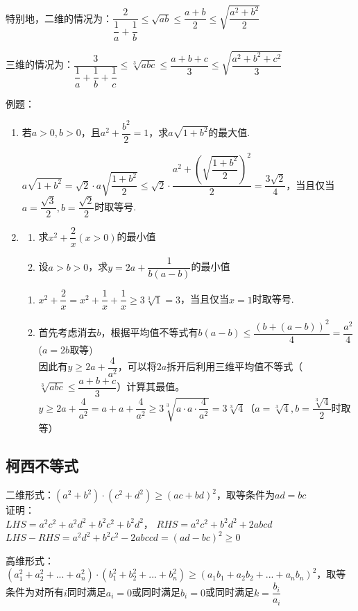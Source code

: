 特别地，二维的情况为：$\dfrac{2}{\dfrac{1}{a} + \dfrac{1}{b}} \leq \sqrt{ab} \leq \dfrac{a+b}{2} \leq \sqrt{\dfrac{a^2 + b^2}{2}}$ \\
\par 三维的情况为：$\dfrac{3}{\dfrac{1}{a} + \dfrac{1}{b} + \dfrac{1}{c}} \leq \sqrt[3]{abc} \leq \dfrac{a+b+c}{3} \leq \sqrt{\dfrac{a^2 + b^2 + c^2}{3}}$

例题：
\begin{enumerate}
    \item 若$a > 0, b > 0$，且$a^2+\dfrac{b^2}{2} = 1$，求$a\sqrt{1+b^2}$的最大值.
    \begin{jieda}
        $a\sqrt{1+b^2} = \sqrt{2} \cdot a \sqrt{\dfrac{1+b^2}{2}} \leq \sqrt{2} \cdot \dfrac{a^2 + \left(\sqrt{\dfrac{1+b^2}{2}}\right)^2}{2} = \dfrac{3\sqrt{2}}{4}$，当且仅当$a = \dfrac{\sqrt{3}}{2}, b = \dfrac{\sqrt{2}}{2}$时取等号.
    \end{jieda}
    
    \item 
    \begin{enumerate}
        \item 求$x^2+\dfrac{2}{x}(x>0)$的最小值
        \item 设$a > b > 0$，求$y = 2a + \dfrac{1}{b(a-b)}$的最小值
    \end{enumerate}
    \begin{jieda}
        \begin{enumerate}
            \item $x^2+\dfrac{2}{x} = x^2 + \dfrac{1}{x} + \dfrac{1}{x} \geq 3\sqrt[3]{1} = 3$，当且仅当$x = 1$时取等号.
            \item 首先考虑消去$b$，根据平均值不等式有$b(a-b) \leq \dfrac{(b+(a-b))^2}{4} = \dfrac{a^2}{4}$ ($a = 2b$取等)\\
            因此有$y \geq 2a + \dfrac{4}{a^2}$，可以将$2a$拆开后利用三维平均值不等式（$\sqrt[3]{abc} \leq \dfrac{a+b+c}{3}$）计算其最值。$y \geq 2a + \dfrac{4}{a^2} = a + a + \dfrac{4}{a^2} \geq 3\sqrt[3]{a\cdot a \cdot \dfrac{4}{a^2}} = 3\sqrt[3]{4}$（$a = \sqrt[3]{4}, b = \dfrac{\sqrt[3]{4}}{2}$时取等）
        \end{enumerate}
    \end{jieda}
\end{enumerate}

\subsection*{柯西不等式}
二维形式：$(a^2+b^2)\cdot(c^2+d^2) \geq (ac+bd)^2$，取等条件为$ad 
 = bc$ \\
证明：\\
$LHS = a^2c^2 + a^2d^2 + b^2c^2 + b^2d^2$， $RHS = a^2c^2 + b^2d^2 + 2abcd$ \\
$LHS - RHS = a^2d^2 + b^2c^2 - 2abccd = (ad-bc)^2 \geq 0$
\par 高维形式：$(a_1^2 + a_2^2 + ... + a_n^2) \cdot (b_1^2 + b_2^2 + ... + b_n^2) \geq (a_1b_1 + a_2b_2 + ... +a_nb_n)^2$，取等条件为对所有$i$同时满足$a_i = 0$或同时满足$b_i = 0$或同时满足$k = \dfrac{b_i}{a_i}$